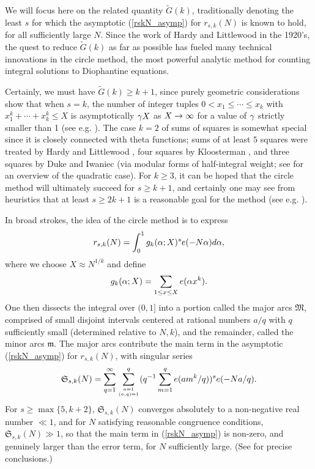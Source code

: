 \documentclass[brochure,english,12pt]{bourbaki}%
\begin{document}
We will focus here on the related quantity $\tilde{G}(k)$, traditionally denoting the least $s$ for which the asymptotic (\ref{rskN_asymp}) for $r_{s,k}(N)$ is known to hold, for all sufficiently large $N$. Since the work of Hardy and Littlewood in the 1920's, the quest  to reduce $\tilde{G}(k)$ as far as possible has fueled many technical innovations in the circle method, the most powerful analytic method for counting integral solutions to Diophantine equations.


Certainly, we must have $\tilde{G}(k) \geq k+1$, since purely geometric considerations show that when $s=k$, the number of  integer tuples $0<x_1 \leq \cdots \leq x_k$ with  $x_1^k + \cdots + x_k^k \leq X$ is asymptotically $\gamma X$ as $X \rightarrow \infty$ for a value of $\gamma$ strictly smaller than 1 (see e.g. \cite[Ch. 9]{Dav05}). The case $k=2$ of sums of squares is somewhat special since it is closely connected with theta functions; sums of at least $5$ squares were treated by Hardy and Littlewood \cite{HarLit20}, four squares by Kloosterman \cite{Klo49}, and three squares  by Duke \cite{Duk88} and Iwaniec \cite{Iwa87} (via modular forms of half-integral weight; see \cite[Ch. 20]{IK} for an overview of the quadratic case).
 For $k \geq 3$, it can be hoped that the circle method will ultimately succeed for $s \geq k+1$, and certainly one may see from heuristics  that at least $s \geq 2k+1$ is a reasonable goal for the method (see e.g. \cite{HB07b}).


In broad strokes, the idea of the circle method is to express 
\[ r_{s,k}(N) = \int_0^1 g_k(\alpha;X)^s e(-N\alpha) d\alpha ,\]
where we choose $X \approx N^{1/k}$ and define
\[g_k(\alpha;X)=\sum_{1 \leq x \leq X} e(\alpha x^k).\]
One then dissects the integral over $(0,1]$ into a portion called the major arcs $\mathfrak{M}$, comprised of small disjoint intervals centered at rational numbers $a/q$ with $q$ sufficiently small (determined relative to $N,k$), and the remainder, called the minor arcs $\mathfrak{m}$. The major arcs contribute the main term in the asymptotic (\ref{rskN_asymp}) for $r_{s,k}(N)$, with singular series
\[ \mathfrak{S}_{s,k}(N) = \sum_{q=1}^\infty \sum_{a=1 \atop (a,q)=1}^q ( q^{-1} \sum_{m=1}^q e(am^k/q))^s e(-Na/q).\]
 For $s \geq \max\{5,k+2\}$, $\mathfrak{S}_{s,k}(N)$ converges absolutely to a non-negative real number $\ll 1$, and for $N$ satisfying reasonable congruence conditions, $\mathfrak{S}_{s,k}(N) \gg 1$, so that the main term in (\ref{rskN_asymp}) is non-zero, and genuinely larger than the error term, for $N$ sufficiently large. (See \cite[\S 4.3, 4.5, 4.6]{Vau97} for precise conclusions.)
\end{document}
